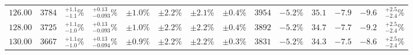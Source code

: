 \begin{landscape}
\begin{table}[ht!]
{\begin{tabular}{| cc | ccc | ccc | ccc | cc | c |}
$126.00$ & $3784$ & $^{+1.1}_{-1.1}\%$ & {\color{black!55}$^{+0.13}_{-0.093}\%$} & {\color{black!55}$\pm 1.0\%$} & $\pm 2.2\%$ & {\color{black!55}$\pm 2.1\%$} & {\color{black!55}$\pm 0.4\%$} & $3954$ & $-5.2\%$ & $35.1$ & $-7.9$ & $-9.6$ & $^{+2.5}_{-2.4}\%$ \\
$128.00$ & $3725$ & $^{+1.1}_{-1.0}\%$ & {\color{black!55}$^{+0.13}_{-0.093}\%$} & {\color{black!55}$\pm 1.0\%$} & $\pm 2.2\%$ & {\color{black!55}$\pm 2.2\%$} & {\color{black!55}$\pm 0.4\%$} & $3892$ & $-5.2\%$ & $34.7$ & $-7.7$ & $-9.2$ & $^{+2.5}_{-2.4}\%$ \\
$130.00$ & $3667$ & $^{+1.1}_{-1.0}\%$ & {\color{black!55}$^{+0.13}_{-0.094}\%$} & {\color{black!55}$\pm 0.9\%$} & $\pm 2.2\%$ & {\color{black!55}$\pm 2.2\%$} & {\color{black!55}$\pm 0.3\%$} & $3831$ & $-5.2\%$ & $34.3$ & $-7.5$ & $-8.6$ & $^{+2.5}_{-2.4}\%$ \\
\cline{1-14}
\end{tabular}
}
\end{table}


\end{landscape}
